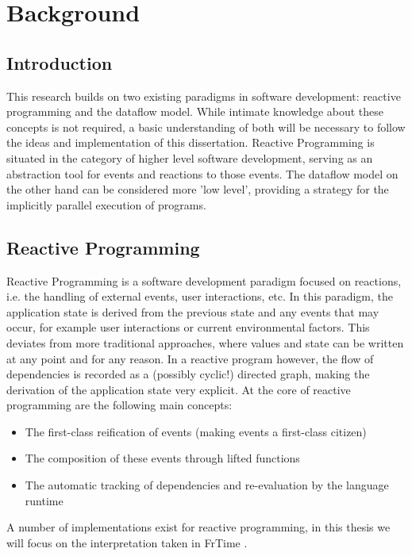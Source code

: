 \chapter{Background}

\section{Introduction}

This research builds on two existing paradigms in software development: reactive programming and the dataflow model. While intimate knowledge about these concepts is not required, a basic understanding of both will be necessary to follow the ideas and implementation of this dissertation. Reactive Programming is situated in the category of higher level software development, serving as an abstraction tool for events and reactions to those events. The dataflow model on the other hand can be considered more 'low level', providing a strategy for the implicitly parallel execution of programs. 

\newpage

\section{Reactive Programming}

Reactive Programming is a software development paradigm focused on reactions, i.e. the handling of external events, user interactions, etc.  In this paradigm, the application state is derived from the previous state and any events that may occur, for example user interactions or current environmental factors. This deviates from more traditional approaches, where values and state can be written at any point and for any reason. In a reactive program however, the flow of dependencies is recorded as a (possibly cyclic!) directed graph, making the derivation of the application state very explicit.
At the core of reactive programming are the following main concepts:
\begin{itemize}
	\item The first-class reification of events (making events a first-class citizen)
	\item The composition of these events through lifted functions
	\item The automatic tracking of dependencies and re-evaluation by the language runtime
\end{itemize}

A number of implementations exist for reactive programming, in this thesis we will focus on the interpretation taken in FrTime \citep{cooper_embedding_2006}.

